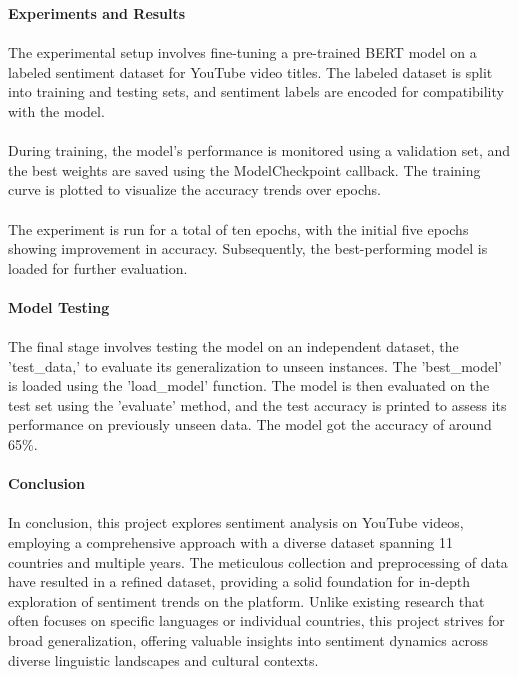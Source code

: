 \documentclass[12pt]{article}
\begin{document}
{{\bf \large Experiments and Results}\\ \\
{The experimental setup involves fine-tuning a pre-trained BERT model on a labeled sentiment dataset for YouTube video titles. The labeled dataset is split into training and testing sets, and sentiment labels are encoded for compatibility with the model.}\\ \\
{During training, the model's performance is monitored using a validation set, and the best weights are saved using the ModelCheckpoint callback. The training curve is plotted to visualize the accuracy trends over epochs.}\\ \\
The experiment is run for a total of ten epochs, with the initial five epochs showing improvement in accuracy. Subsequently, the best-performing model is loaded for further evaluation.}\\ \\
{\bf \large Model Testing}\\ \\
{The final stage involves testing the model on an independent dataset, the 'test\_data,' to evaluate its generalization to unseen instances. The 'best\_model' is loaded using the 'load\_model' function. The model is then evaluated on the test set using the 'evaluate' method, and the test accuracy is printed to assess its performance on previously unseen data. The model got the accuracy of around 65\%.}\\ \\
{\bf \large Conclusion}\\ \\
{In conclusion, this project explores sentiment analysis on YouTube videos, employing a comprehensive approach with a diverse dataset spanning 11 countries and multiple years. The meticulous collection and preprocessing of data have resulted in a refined dataset, providing a solid foundation for in-depth exploration of sentiment trends on the platform. Unlike existing research that often focuses on specific languages or individual countries, this project strives for broad generalization, offering valuable insights into sentiment dynamics across diverse linguistic landscapes and cultural contexts.}\\ \\
\end{document}
